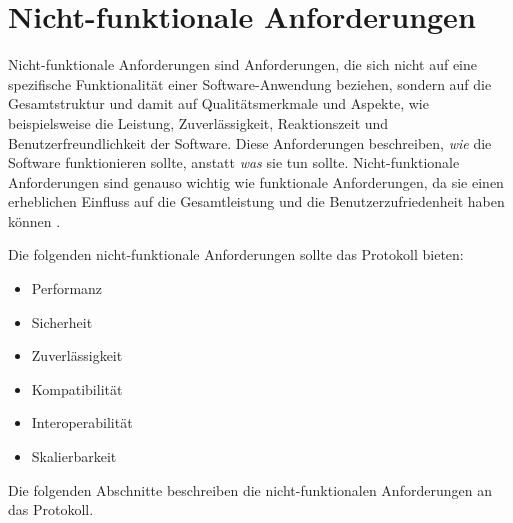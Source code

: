 \section{Nicht-funktionale Anforderungen}


Nicht-funktionale Anforderungen sind Anforderungen, die sich nicht auf eine 
spezifische Funktionalität einer Software-Anwendung beziehen, sondern auf die Gesamtstruktur und damit auf
Qualitätsmerkmale und Aspekte, wie beispielsweise die Leistung, Zuverlässigkeit, Reaktionszeit und Benutzerfreundlichkeit 
der Software. 
Diese Anforderungen beschreiben, \textit{wie} die Software funktionieren sollte, anstatt \textit{was} sie tun sollte. 
Nicht-funktionale Anforderungen sind genauso wichtig wie funktionale Anforderungen, da sie einen 
erheblichen Einfluss auf die Gesamtleistung und die Benutzerzufriedenheit haben können
\parencite[S. 126-130]{Sommerville_AnfAnalyse}.

Die folgenden nicht-funktionale Anforderungen sollte das Protokoll bieten:

\begin{itemize}
    \item Performanz
    \item Sicherheit
    \item Zuverlässigkeit
    \item Kompatibilität
    \item Interoperabilität
    \item Skalierbarkeit
\end{itemize}

\noindent Die folgenden Abschnitte beschreiben die nicht-funktionalen Anforderungen an das Protokoll.






